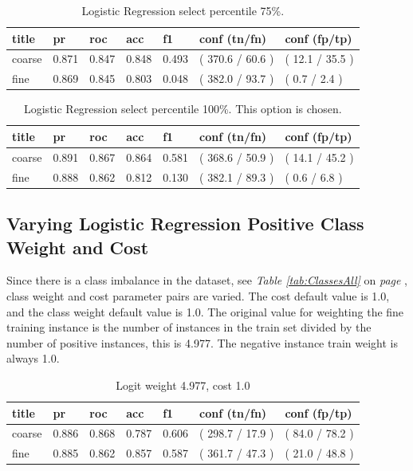 \documentclass[ms]{nuthesis}
\begin{document}
\FloatBarrier
\begin{table}[H]
\centering
\caption{Logistic Regression select percentile 75\%.}
\label{tab:LogRegSel75}
\begin{tabular}{|l||l||l||l||l||l||l|}\toprule
title & pr & roc & acc & f1 & conf (tn/fn) & conf (fp/tp) \\ \midrule
coarse & 0.871 & 0.847 & 0.848 & 0.493 & ( 370.6 / 60.6 ) & ( 12.1 / 35.5 ) \\
fine & 0.869 & 0.845 & 0.803 & 0.048 & ( 382.0 / 93.7 ) & ( 0.7 / 2.4 ) \\ \bottomrule
\end{tabular}
\end{table}
\FloatBarrier


\FloatBarrier
\begin{table}[H]
\centering
\caption{Logistic Regression select percentile 100\%. This option is chosen.}
\label{tab:LogRegMinMax}
\begin{tabular}{|l||l||l||l||l||l||l|}\toprule
title & pr & roc & acc & f1 & conf (tn/fn) & conf (fp/tp) \\ \midrule
coarse & 0.891 & 0.867 & 0.864 & 0.581 & ( 368.6 / 50.9 ) & ( 14.1 / 45.2 ) \\
fine & 0.888 & 0.862 & 0.812 & 0.130 & ( 382.1 / 89.3 ) & ( 0.6 / 6.8 ) \\ \bottomrule
\end{tabular}
\end{table}
\FloatBarrier


\subsection{Varying Logistic Regression Positive Class Weight and Cost}
\par Since there is a class imbalance in the dataset, see \textit{Table \ref{tab:ClassesAll} } on
\textit{page \pageref{tab:ClassesAll}}, class weight and cost parameter pairs are varied.  The cost
default value is 1.0, and the class weight default value is 1.0. The original value for weighting the
fine training instance is the number of instances in the train set divided by the number of positive
instances, this is 4.977. The negative instance train weight is always 1.0.

\FloatBarrier
\begin{table}[H]
\centering
\caption{Logit weight 4.977, cost 1.0}
\label{tab:LogRegWtOrig-C1}
\begin{tabular}{|l||l||l||l||l||l||l|}\toprule
title & pr & roc & acc & f1 & conf (tn/fn) & conf (fp/tp) \\ \midrule
coarse & 0.886 & 0.868 & 0.787 & 0.606 & ( 298.7 / 17.9 ) & ( 84.0 / 78.2 ) \\
fine & 0.885 & 0.862 & 0.857 & 0.587 & ( 361.7 / 47.3 ) & ( 21.0 / 48.8 ) \\ \bottomrule
\end{tabular}
\end{table}
\FloatBarrier
\end{document}
